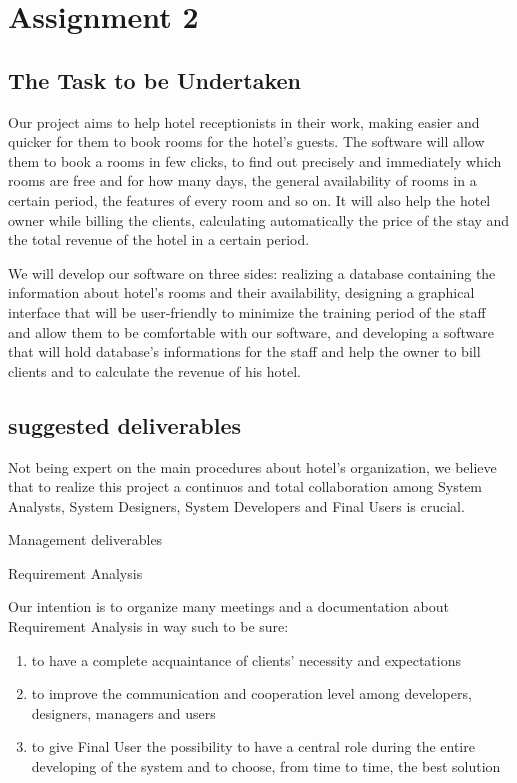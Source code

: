 
\section{Assignment 2}

\subsection{The Task to be Undertaken}
Our project aims to help hotel receptionists in their work, making easier and quicker for them to book rooms for the hotel's guests. The software will allow them to book a rooms in few clicks, to find out precisely and immediately which rooms are free and for how many days, the general availability of rooms in a certain period, the features of every room and so on. It will also help the hotel owner while billing the clients, calculating automatically the price of the stay and the total revenue of the hotel in a certain period.

We will develop our software on three sides: realizing a database containing the information about hotel's rooms and their availability, designing a graphical interface that will be user-friendly to minimize the training period of the staff and allow them to be comfortable with our software, and developing a software that will hold database's informations for the staff and help the owner to bill clients and to calculate the revenue of his hotel.




\subsection{suggested deliverables}
Not being expert on the main procedures about hotel’s organization, we believe that to realize this project a continuos and total collaboration among System Analysts, System Designers, System Developers and Final Users is crucial.


Management deliverables

Requirement Analysis 
	
	Our intention is to organize many meetings and a documentation about Requirement Analysis in way such to be sure:
\begin{enumerate}
	\item to have a complete acquaintance of clients’ necessity and expectations
	\item to improve the communication and cooperation level among developers,
	  designers, managers and users
	\item to give Final User the possibility to have a central role during the entire 
	  developing of the system and to choose, from time to time, the best solution
\end{enumerate}

